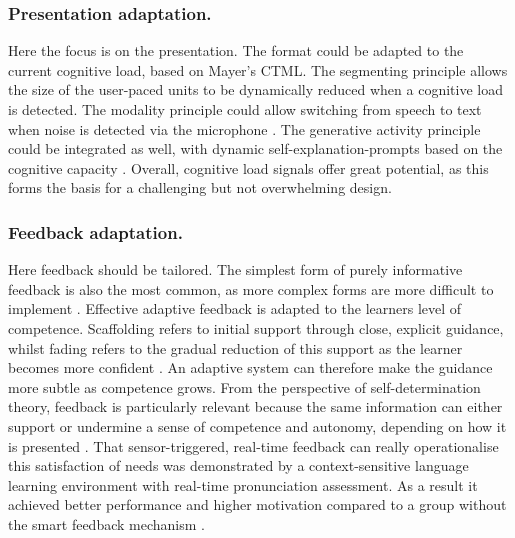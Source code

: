 \documentclass[runningheads]{llncs}
\begin{document}
\subsubsection{Presentation adaptation.}
Here the focus is on the presentation. The format could be adapted to the current cognitive load, based on Mayer’s CTML. The segmenting principle allows the size of the user-paced units to be dynamically reduced when a cognitive load is detected. The modality principle could allow switching from speech to text when noise is detected via the microphone \cite{mayer_past_2024}. The generative activity principle could be integrated as well, with dynamic self-explanation-prompts based on the cognitive capacity \cite{mayer_past_2024}. Overall, cognitive load signals offer great potential, as this forms the basis for a challenging but not overwhelming design.

\subsubsection{Feedback adaptation.}

Here feedback should be tailored. The simplest form of purely informative feedback is also the most common, as more complex forms are more difficult to implement \cite{hasanov_survey_2019}.
Effective adaptive feedback is adapted to the learners level of competence. Scaffolding refers to initial support through close, explicit guidance, whilst fading refers to the gradual reduction of this support as the learner becomes more confident \cite{hasanov_survey_2019}.
An adaptive system can therefore make the guidance more subtle as competence grows.
From the perspective of self-determination theory, feedback is particularly relevant because the same information can either support or undermine a sense of competence and autonomy, depending on how it is presented \cite{ryan_intrinsic_2020}.
That sensor-triggered, real-time feedback can really operationalise this satisfaction of needs was demonstrated by a context-sensitive language learning environment with real-time pronunciation assessment. As a result it achieved better performance and higher motivation compared to a group without the smart feedback mechanism \cite{liu_effect_2026}. %
\end{document}
